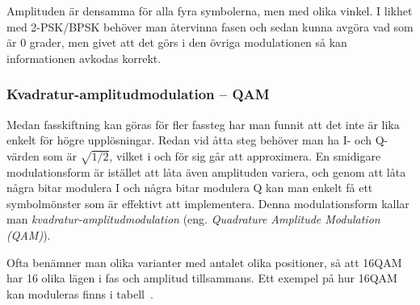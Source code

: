 Amplituden är densamma för alla fyra symbolerna, men med olika vinkel.
I likhet med 2-PSK/BPSK behöver man återvinna fasen och sedan kunna avgöra
vad som är 0 grader, men givet att det görs i den övriga modulationen så
kan informationen avkodas korrekt.

\subsubsection{Kvadratur-amplitudmodulation -- QAM}
\label{QAM}

Medan fasskiftning kan göras för fler fassteg har man funnit att det inte
är lika enkelt för högre upplösningar.
Redan vid åtta steg behöver man ha I- och Q-värden som är \(\sqrt{1/2}\), vilket
i och för sig går att approximera.
En smidigare modulationsform är istället att låta även amplituden variera,
och genom att låta några bitar modulera I och några bitar modulera Q kan
man enkelt få ett symbolmönster som är effektivt att implementera.
Denna modulationsform kallar man \emph{kvadratur-amplitudmodulation}
(eng. \emph{Quadrature Amplitude Modulation (QAM)}).

Ofta benämner man olika varianter med antalet olika positioner, så att 16QAM
har 16 olika lägen i fas och amplitud tillsammans.
Ett exempel på hur 16QAM kan moduleras finns i tabell~.

